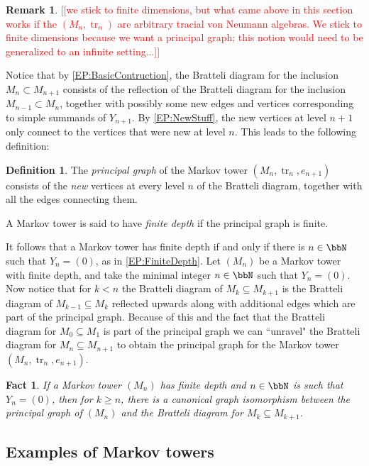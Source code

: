 \documentclass[11pt]{article}
\theoremstyle{plain}
\newtheorem{fact}[thm]{Fact}
\theoremstyle{definition}
\newtheorem{defn}[thm]{Definition}
\newtheorem{rem}[thm]{Remark}
\DeclareMathOperator{\tr}{tr}
\newcommand{\nn}[1]{\textcolor{red}{[[#1]]}}
\begin{document}
\begin{rem}
\nn{we stick to finite dimensions, but what came above in this section works if the $(M_n,\tr_n)$ are arbitrary tracial von Neumann algebras.
We stick to finite dimensions because we want a principal graph; this notion would need to be generalized to an infinite setting...}
\end{rem}


Notice that by \ref{EP:BasicContruction}, the Bratteli diagram for the inclusion $M_{n}\subset M_{n+1}$ consists of the reflection of the Bratteli diagram for the inclusion $M_{n-1} \subset M_n$, together with possibly some new edges and vertices corresponding to simple summands of $Y_{n+1}$. 
By \ref{EP:NewStuff}, the new vertices at level $n+1$ only connect to the vertices that were new at level $n$. This leads to the following definition:

\begin{defn}
The \emph{principal graph} of the Markov tower $(M_n,\tr_n, e_{n+1})$ consists of the \emph{new} vertices at every level $n$ of the Bratteli diagram, together with all the edges connecting them.

A Markov tower is said to have \emph{finite depth} if the principal graph is finite.
\end{defn}


It follows that a Markov tower has finite depth if and only if there is $n\in \bbN$ such that $Y_n = (0)$, as in \ref{EP:FiniteDepth}. 
Let $(M_n)$ be a Markov tower with finite depth, and take the minimal integer $n\in \bbN$ such that $Y_n=(0)$. 
Now notice that for $k<n$ the Bratteli diagram of $M_k\subseteq M_{k+1}$ is the Bratteli diagram of $M_{k-1}\subseteq M_{k}$ reflected upwards along with additional edges which are part of the principal graph. 
Because of this and the fact that the Bratteli diagram for $M_0\subseteq M_1$ is part of the principal graph we can ``unravel" the Bratteli diagram for $M_{n}\subseteq M_{n+1}$ to obtain the principal graph for the Markov tower $(M_n,\tr_n,e_{n+1})$.

\begin{fact}\label{BratteliPrincipal}
	If a Markov tower $(M_n)$ has finite depth and $n\in \bbN$ is such that $Y_n=(0)$, then for $k\geq n$, there is a canonical graph isomorphism between the principal graph of $(M_n)$ and the Bratteli diagram for $M_{k}\subseteq M_{k+1}$.
\end{fact}

\subsection{Examples of Markov towers}
\end{document}
